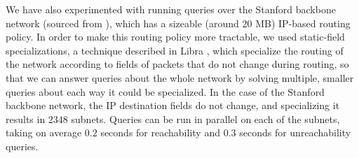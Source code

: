 We have also experimented with running queries over the Stanford
backbone network (sourced from \cite{hsa}), which has a sizeable
(around 20 MB) IP-based routing policy. In order to make this routing
policy more tractable, we used static-field specializations, a
technique described in Libra \citep{libra}, which specialize the
routing of the network according to fields of packets that do not
change during routing, so that we can answer queries about the whole
network by solving multiple, smaller queries about each way it could
be specialized. In the case of the Stanford backbone network, the IP
destination fields do not change, and specializing it results in
$2348$ subnets. Queries can be run in parallel on each of the subnets,
taking on average $0.2$ seconds for reachability and $0.3$ seconds for
unreachability queries.

